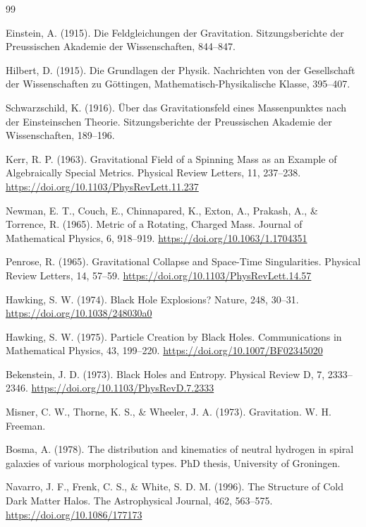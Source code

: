 \documentclass[12pt,a4paper]{article}
\begin{document}
	\begin{thebibliography}{99}
		
		Einstein, A. (1915). Die Feldgleichungen der Gravitation. Sitzungsberichte der Preussischen Akademie der Wissenschaften, 844–847.
		
		Hilbert, D. (1915). Die Grundlagen der Physik. Nachrichten von der Gesellschaft der Wissenschaften zu Göttingen, Mathematisch-Physikalische Klasse, 395–407.
		
		Schwarzschild, K. (1916). Über das Gravitationsfeld eines Massenpunktes nach der Einsteinschen Theorie. Sitzungsberichte der Preussischen Akademie der Wissenschaften, 189–196.
		
		Kerr, R. P. (1963). Gravitational Field of a Spinning Mass as an Example of Algebraically Special Metrics. Physical Review Letters, 11, 237–238. \url{https://doi.org/10.1103/PhysRevLett.11.237}
		
		Newman, E. T., Couch, E., Chinnapared, K., Exton, A., Prakash, A., \& Torrence, R. (1965). Metric of a Rotating, Charged Mass. Journal of Mathematical Physics, 6, 918–919. \url{https://doi.org/10.1063/1.1704351}
		
		Penrose, R. (1965). Gravitational Collapse and Space-Time Singularities. Physical Review Letters, 14, 57–59. \url{https://doi.org/10.1103/PhysRevLett.14.57}
		
		Hawking, S. W. (1974). Black Hole Explosions? Nature, 248, 30–31. \url{https://doi.org/10.1038/248030a0}
		
		Hawking, S. W. (1975). Particle Creation by Black Holes. Communications in Mathematical Physics, 43, 199–220. \url{https://doi.org/10.1007/BF02345020}
		
		Bekenstein, J. D. (1973). Black Holes and Entropy. Physical Review D, 7, 2333–2346. \url{https://doi.org/10.1103/PhysRevD.7.2333}
		
		Misner, C. W., Thorne, K. S., \& Wheeler, J. A. (1973). Gravitation. W. H. Freeman.
		
		Bosma, A. (1978). The distribution and kinematics of neutral hydrogen in spiral galaxies of various morphological types. PhD thesis, University of Groningen.
		
		Navarro, J. F., Frenk, C. S., \& White, S. D. M. (1996). The Structure of Cold Dark Matter Halos. The Astrophysical Journal, 462, 563–575. \url{https://doi.org/10.1086/177173}
		

\end{thebibliography}
\end{document}
